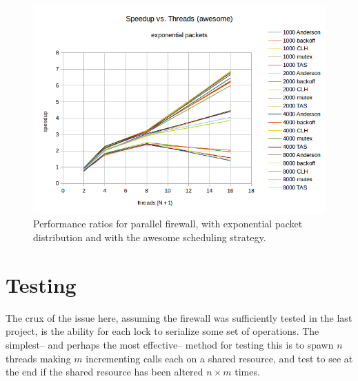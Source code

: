 \documentclass{article}
\begin{document}

\begin{figure}
\begin{center}
	\includegraphics[scale=.8]{packet_4.png}
	\caption{Performance ratios for parallel firewall, with exponential packet distribution and with the awesome scheduling strategy.}
	\label{packet_4}
\end{center}
\end{figure}

\section{Testing}

The crux of the issue here, assuming the firewall was sufficiently tested in the last project, is the ability for each lock to serialize some set of operations. The 
simplest-- and perhaps the most effective-- method for testing this is to spawn $n$ threads making $m$ incrementing calls each on a shared resource, and test to see 
at the end if the shared resource has been altered $n\times m$ times.
\end{document}

